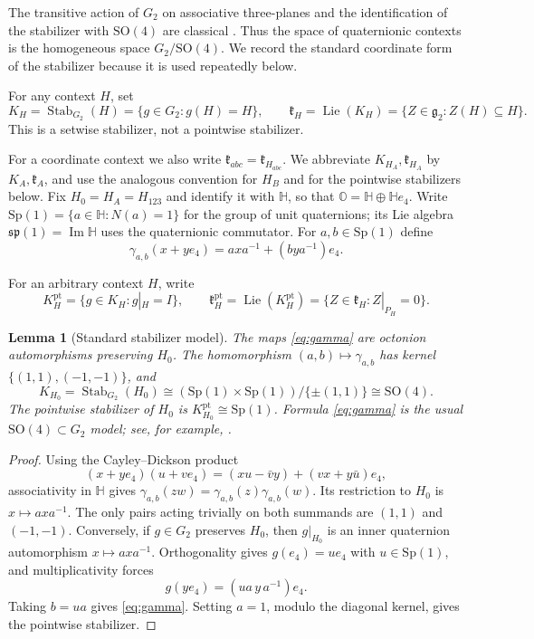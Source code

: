 \documentclass[11pt,a4paper]{article}
\newtheorem{lemma}[lemma]{Lemma}
\newcommand{\HH}{\mathbb H}
\newcommand{\OO}{\mathbb O}
\newcommand{\SO}{\mathrm{SO}}
\newcommand{\Sp}{\mathrm{Sp}}
\newcommand{\Stab}{\operatorname{Stab}}
\newcommand{\Lie}{\operatorname{Lie}}
\begin{document}
The transitive action of $G_2$ on associative three-planes and the identification of the stabilizer with $\SO(4)$ are classical \cite{HarveyLawson1982,Cacciatori2005,KnarrStroppel2025,ChemtovKarigiannis2022}.  Thus the space of quaternionic contexts is the homogeneous space $G_2/\SO(4)$.
We record the standard coordinate form of the stabilizer because it is used repeatedly below.

For any context $H$, set
\[
K_H=\Stab_{G_2}(H)=\{g\in G_2:g(H)=H\},\qquad
\mathfrak k_H=\Lie(K_H)=\{Z\in\mathfrak g_2:Z(H)\subseteq H\}.
\]
This is a setwise stabilizer, not a pointwise stabilizer.

For a coordinate context we also write $\mathfrak k_{abc}=\mathfrak k_{H_{abc}}$.  We abbreviate $K_{H_A},\mathfrak k_{H_A}$ by $K_A,\mathfrak k_A$, and use the analogous convention for $H_B$ and for the pointwise stabilizers below.  Fix $H_0=H_A=H_{123}$ and identify it with $\HH$, so that $\OO=\HH\oplus\HH e_4$.  Write $\Sp(1)=\{a\in\HH:N(a)=1\}$ for the group of unit quaternions; its Lie algebra $\mathfrak{sp}(1)=\operatorname{Im}\HH$ uses the quaternionic commutator.  For $a,b\in\Sp(1)$ define
\begin{equation}
\gamma_{a,b}(x+ye_4)=axa^{-1}+(bya^{-1})e_4.
\label{eq:gamma}
\end{equation}

For an arbitrary context $H$, write
\[
K_H^{\mathrm{pt}}=\{g\in K_H:g|_H=I\},\qquad
\mathfrak k_H^{\mathrm{pt}}=\Lie(K_H^{\mathrm{pt}})
=\{Z\in\mathfrak k_H:Z|_{P_H}=0\}.
\]

\begin{lemma}[Standard stabilizer model]
\label{prop:stabilizer}
The maps \eqref{eq:gamma} are octonion automorphisms preserving $H_0$.  The homomorphism $(a,b)\mapsto\gamma_{a,b}$ has kernel $\{(1,1),(-1,-1)\}$, and
\[
K_{H_0}=\Stab_{G_2}(H_0)
\cong(\Sp(1)\times\Sp(1))/\{\pm(1,1)\}
\cong\SO(4).
\]
The pointwise stabilizer of $H_0$ is $K_{H_0}^{\mathrm{pt}}\cong\Sp(1)$.  Formula \eqref{eq:gamma} is the usual $\SO(4)\subset G_2$ model; see, for example, \cite{Cacciatori2005}.
\end{lemma}

\begin{proof}
Using the Cayley--Dickson product
\[
(x+ye_4)(u+ve_4)=(xu-\bar v y)+(vx+y\bar u)e_4,
\]
associativity in $\HH$ gives $\gamma_{a,b}(zw)=\gamma_{a,b}(z)\gamma_{a,b}(w)$.  Its restriction to $H_0$ is $x\mapsto axa^{-1}$.  The only pairs acting trivially on both summands are $(1,1)$ and $(-1,-1)$.  Conversely, if $g\in G_2$ preserves $H_0$, then $g|_{H_0}$ is an inner quaternion automorphism $x\mapsto axa^{-1}$.  Orthogonality gives $g(e_4)=ue_4$ with $u\in\Sp(1)$, and multiplicativity forces
\[
g(ye_4)=(ua\,y\,a^{-1})e_4.
\]
Taking $b=ua$ gives \eqref{eq:gamma}.  Setting $a=1$, modulo the diagonal kernel, gives the pointwise stabilizer.
\end{proof}
\end{document}
